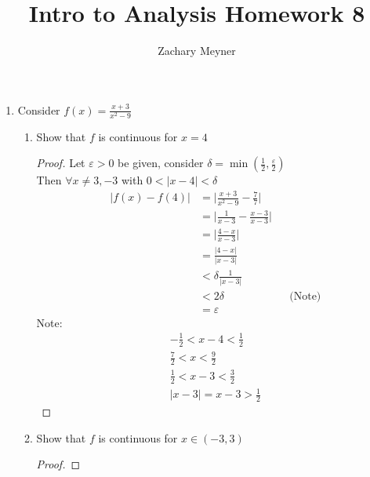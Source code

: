 \documentclass[12pt]{article}
\title{\large Intro to Analysis Homework 8}
\author{\large Zachary Meyner}
\date{}
\begin{document}
\maketitle

\begin{enumerate}
	\item Consider $f(x) = \frac{x+3}{x^2-9}$
	      \begin{enumerate}
		      \item Show that $f$ is continuous for $x=4$
		            \begin{proof}
			            Let $\varepsilon > 0$ be given, consider $\delta = \min(\frac{1}{2}, \frac{\varepsilon}{2})$ \\
			            Then $\forall x \neq 3, -3$ with $0 < |x-4| < \delta$
			            \begin{align*}
				            \bigg| f(x) - f(4) \bigg| & = \bigg| \frac{x+3}{x^2-9} - \frac{7}{7} \bigg|                      \\
				                                      & = \bigg| \frac{1}{x-3} - \frac{x-3}{x-3} \bigg|                      \\
				                                      & = \bigg| \frac{4-x}{x-3} \bigg|                                      \\
				                                      & = \frac{|4-x|}{|x-3|}                                                \\
				                                      & < \delta \frac{1}{|x-3|}                                             \\
				                                      & < 2\delta                                       &  & \text{(Note)} \\
                                                      & = \varepsilon
			            \end{align*}
			            Note:
			            \begin{gather*}
				            -\frac{1}{2} < x-4 < \frac{1}{2} \\
				            \frac{7}{2} < x < \frac{9}{2} \\
				            \frac{1}{2} < x-3 < \frac{3}{2} \\
				            |x-3| = x-3 > \frac{1}{2}
			            \end{gather*}
		            \end{proof}
            \item Show that $f$ is continuous for $x \in (-3, 3)$
            \begin{proof}

\end{proof}
\end{enumerate}
\end{enumerate}
\end{document}
